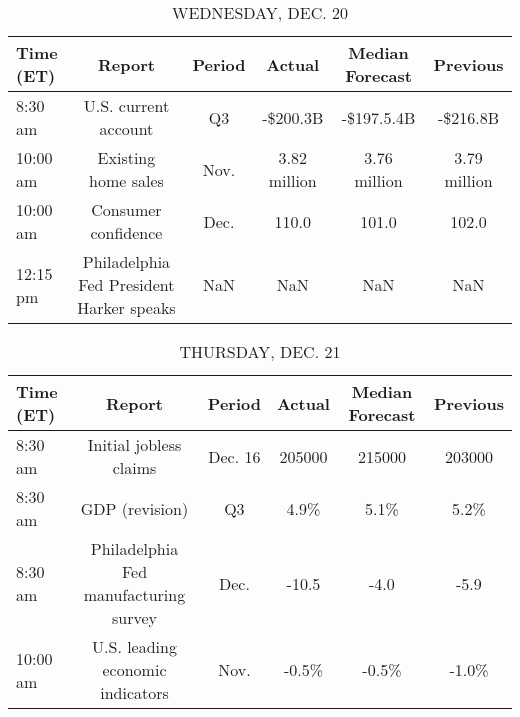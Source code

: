 \documentclass{article}%
\begin{document}
\begin{table}[htbp]%
\caption{WEDNESDAY, DEC. 20}%
\centering%
\begin{adjustbox}{width=1\textwidth}%
\begin{tabular}{lccccc}
\toprule
Time (ET) &                                   Report & Period &       Actual & Median Forecast &     Previous \\
\midrule
  8:30 am &                     U.S. current account &     Q3 &     -\$200.3B &      -\$197.5.4B &     -\$216.8B \\
 10:00 am &                      Existing home sales &   Nov. & 3.82 million &    3.76 million & 3.79 million \\
 10:00 am &                      Consumer confidence &   Dec. &        110.0 &           101.0 &        102.0 \\
 12:15 pm & Philadelphia Fed President Harker speaks &    NaN &          NaN &             NaN &          NaN \\
\bottomrule
\end{tabular}
%
\end{adjustbox}%
\end{table}

%


\begin{table}[htbp]%
\caption{THURSDAY, DEC. 21}%
\centering%
\begin{adjustbox}{width=1\textwidth}%
\begin{tabular}{lccccc}
\toprule
Time (ET) &                                Report &  Period & Actual & Median Forecast & Previous \\
\midrule
  8:30 am &                Initial jobless claims & Dec. 16 & 205000 &          215000 &   203000 \\
  8:30 am &                        GDP (revision) &      Q3 &   4.9\% &            5.1\% &     5.2\% \\
  8:30 am & Philadelphia Fed manufacturing survey &    Dec. &  -10.5 &            -4.0 &     -5.9 \\
 10:00 am &      U.S. leading economic indicators &    Nov. &  -0.5\% &           -0.5\% &    -1.0\% \\
\bottomrule
\end{tabular}
%
\end{adjustbox}%
\end{table}

%
\end{document}
